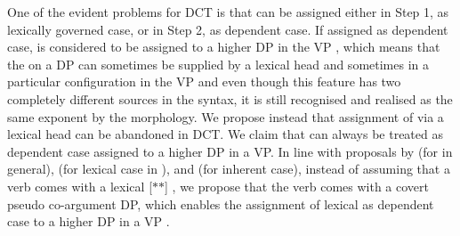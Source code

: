 \documentclass[output=paper,modfonts,newtxmath,hidelinks]{langscibook}
\begin{document}
One of the evident problems for DCT is that \datt{} can be assigned either in Step 1, as lexically governed case, or in Step 2, as dependent case. If assigned as dependent case, \datt{} is considered to be assigned to a higher DP in the VP \citep{bakervinokurova,baker15}, which means that the  on a  DP can sometimes be supplied by a lexical head and sometimes in a particular configuration in the VP and even though this feature has two completely different sources in the syntax, it is still recognised and realised as the same exponent by the morphology. We propose instead that assignment of  via a lexical head can be abandoned in DCT. We claim that \datt{} can always be treated as dependent case assigned to a higher DP in a VP. In line with proposals by \citet{bittnerhale96,baker15} (for  in general), \citet{wood2016} (for lexical  case in ), and \citet{bakerbobaljik} (for inherent  case), instead of assuming that a verb comes with a lexical [$*$\datt$*$]  , we propose that the verb comes with a covert pseudo co-argument DP, which enables the assignment of lexical  as dependent case to a higher DP in a VP .
\end{document}
